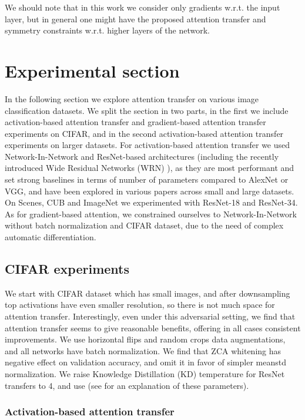 \documentclass{article} \usepackage{iclr2017_conference}
\begin{document}
We should note that in this work we consider only gradients w.r.t. the input layer, but in general one might  have the proposed attention transfer and symmetry constraints w.r.t. higher layers of the network.



\section{Experimental section}\label{sec:results}

In the following section we explore attention transfer on various image classification datasets. We split the section in two parts, in the first we include activation-based attention transfer and gradient-based attention transfer experiments on CIFAR, and in the second activation-based  attention transfer experiments on larger datasets.
For activation-based attention transfer we used Network-In-Network \cite{nin} and ResNet-based architectures (including the recently introduced Wide Residual Networks (WRN) \cite{Zagoruyko2016WRN}), as they are most performant and set strong baselines in terms of number of parameters compared to AlexNet or VGG, and have been explored in various papers across small and large datasets. On Scenes, CUB and ImageNet we experimented with ResNet-18 and ResNet-34.
As for gradient-based attention, we constrained ourselves to Network-In-Network without batch normalization and CIFAR dataset, due to the need of complex automatic differentiation.

\subsection{CIFAR experiments}

We start with CIFAR dataset which has small  images, and after downsampling top activations have even smaller resolution, so there is not much space for attention transfer. Interestingly, even under this adversarial setting, we find that  attention transfer seems to give reasonable benefits, offering in all cases consistent improvements. We use horizontal flips and random crops data augmentations, and all networks have batch normalization. We find that ZCA whitening has negative effect on validation accuracy, and omit it in favor of simpler meanstd normalization. We raise Knowledge Distillation (KD) temperature for ResNet transfers to 4, and use   (see \cite{KD} for an explanation of these parameters).

\subsubsection{Activation-based attention transfer}
\end{document}
